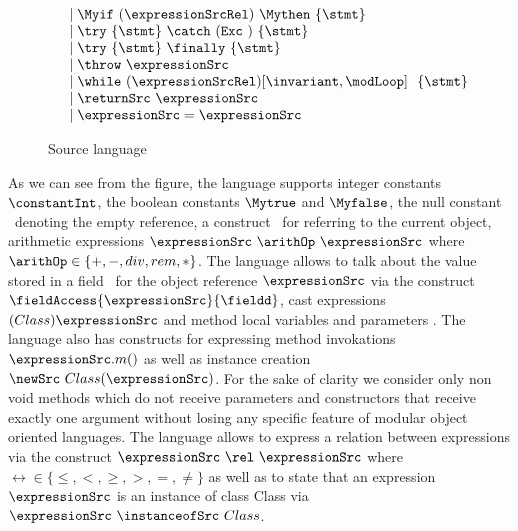\begin{figure}[ht!]
\begin{frameit}
$$\begin{array} {ll}
				& \mid \Myif \ (\expressionSrcRel) \ \Mythen \ \{ \stmt \}	\\
			        & \mid \try  \ \{ \stmt \}  \ \catch \ ( \mbox{\rm\texttt{Exc} } )\ \{ \stmt \} \\
		                & \mid \try  \ \{ \stmt \} \ \finally \ \{ \stmt \} \\
				& \mid \throw \ \expressionSrc  \\
                                & \mid \while \ (\expressionSrcRel) \lbrack \invariant, \modLoop \rbrack \ \do \ \{ \stmt \}\ \\
				& \mid \returnSrc \  \expressionSrc \\
                   		& \mid \expressionSrc = \expressionSrc \\        
    \end{array} $$
\caption{\sc Source language}
\label{source:grammar}
\end{frameit}
\end{figure}


    As we can see from the figure, the language supports 
    integer constants $\constantInt$, the boolean constants  $ \Mytrue$ and $\Myfalse$, the null constant \Mynull \ 
    denoting  the empty reference, a construct \this \ for referring to the current object,  
    arithmetic expressions  $\expressionSrc \ \arithOp \ \expressionSrc$ where $\arithOp \in  \{+ , - , div , rem, * \}$.
    The language  allows to talk about the value stored in a field \fieldd \ for the object reference $\expressionSrc $
    via the construct  $ \fieldAccess{\expressionSrc}{\fieldd} $, cast expressions  $(Class) \expressionSrc$
    and method local variables  and parameters \var.  
    The language also has constructs for expressing method invokations  $ \expressionSrc.m()  $  as well as instance creation
    $\newSrc \ Class(\expressionSrc )$. For the sake of clarity we consider only non void  methods which do not receive parameters and constructors
    that receive exactly one argument without losing
    any specific feature   of modular object oriented  languages. 
    The language allows to express a relation between  expressions via the construct
     $\expressionSrc \ \rel \ \expressionSrc $ where $\rel  \in \{ \le, < ,  \ge, >, = , \neq \}$ as well as to state that an expression 
   $\expressionSrc$ is an instance of class Class via  $\expressionSrc \ \instanceofSrc \ Class$.
    

